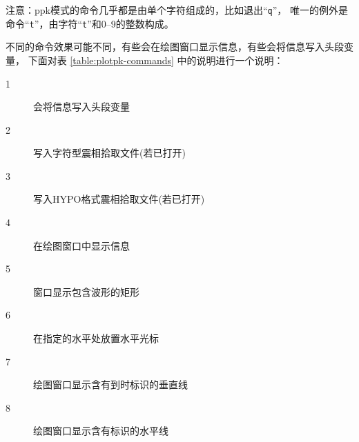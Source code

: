 注意：ppk模式的命令几乎都是由单个字符组成的，比如退出``\texttt{q}''，
唯一的例外是命令``\texttt{t}''，由字符``\texttt{t}''和0--9的整数构成。

不同的命令效果可能不同，有些会在绘图窗口显示信息，有些会将信息写入头段变量，
下面对表 \ref{table:plotpk-commands} 中的说明进行一个说明：
\begin{description}
    \item [1] 会将信息写入头段变量
    \item [2] 写入字符型震相拾取文件(若已打开)
    \item [3] 写入HYPO格式震相拾取文件(若已打开)
    \item [4] 在绘图窗口中显示信息
    \item [5] 窗口显示包含波形的矩形
    \item [6] 在指定的水平处放置水平光标
    \item [7] 绘图窗口显示含有到时标识的垂直线
    \item [8] 绘图窗口显示含有标识的水平线
\end{description}
